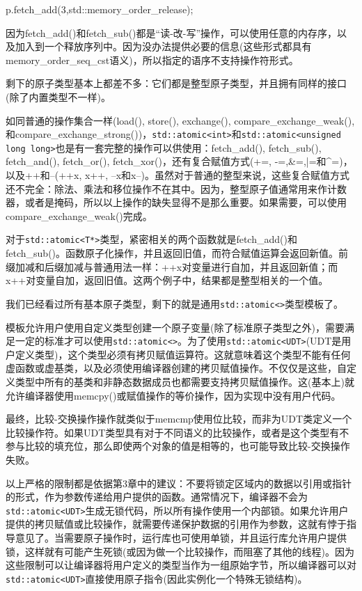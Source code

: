 \begin{cpp}
p.fetch_add(3,std::memory_order_release);
\end{cpp}

因为fetch\_add()和fetch\_sub()都是“读-改-写”操作，可以使用任意的内存序，以及加入到一个释放序列中。因为没办法提供必要的信息(这些形式都具有memory\_order\_seq\_cst语义)，所以指定的语序不支持操作符形式。

剩下的原子类型基本上都差不多：它们都是整型原子类型，并且拥有同样的接口(除了内置类型不一样)。


如同普通的操作集合一样(load(), store(), exchange(), compare\_exchange\_weak(), 和compare\_exchange\_strong())，\texttt{std::atomic<int>}和\texttt{std::atomic<unsigned long long>}也是有一套完整的操作可以供使用：fetch\_add(), fetch\_sub(), fetch\_and(), fetch\_or(), fetch\_xor()，还有复合赋值方式(+=, -=,\&=,|=和\^{}=)，以及++和--(++x, x++, --x和x--)。虽然对于普通的整型来说，这些复合赋值方式还不完全：除法、乘法和移位操作不在其中。因为，整型原子值通常用来作计数器，或者是掩码，所以以上操作的缺失显得不是那么重要。如果需要，可以使用compare\_exchange\_weak()完成。

对于\texttt{std::atomic<T*>}类型，紧密相关的两个函数就是fetch\_add()和fetch\_sub()。函数原子化操作，并且返回旧值，而符合赋值运算会返回新值。前缀加减和后缀加减与普通用法一样：++x对变量进行自加，并且返回新值；而x++对变量自加，返回旧值。这两个例子中，结果都是整型相关的一个值。

我们已经看过所有基本原子类型，剩下的就是通用\texttt{std::atomic<>}类型模板了。


模板允许用户使用自定义类型创建一个原子变量(除了标准原子类型之外)，需要满足一定的标准才可以使用\texttt{std::atomic<>}。为了使用\texttt{std::atomic<UDT>}(UDT是用户定义类型)，这个类型必须有拷贝赋值运算符。这就意味着这个类型不能有任何虚函数或虚基类，以及必须使用编译器创建的拷贝赋值操作。不仅仅是这些，自定义类型中所有的基类和非静态数据成员也都需要支持拷贝赋值操作。这(基本上)就允许编译器使用memcpy()或赋值操作的等价操作，因为实现中没有用户代码。

最终，比较-交换操作操作就类似于memcmp使用位比较，而非为UDT类定义一个比较操作符。如果UDT类型具有对于不同语义的比较操作，或者是这个类型有不参与比较的填充位，那么即使两个对象的值是相等的，也可能导致比较-交换操作失败。

以上严格的限制都是依据第3章中的建议：不要将锁定区域内的数据以引用或指针的形式，作为参数传递给用户提供的函数。通常情况下，编译器不会为\texttt{std::atomic<UDT>}生成无锁代码，所以所有操作使用一个内部锁。如果允许用户提供的拷贝赋值或比较操作，就需要传递保护数据的引用作为参数，这就有悖于指导意见了。当需要原子操作时，运行库也可使用单锁，并且运行库允许用户提供锁，这样就有可能产生死锁(或因为做一个比较操作，而阻塞了其他的线程)。因为这些限制可以让编译器将用户定义的类型当作为一组原始字节，所以编译器可以对\texttt{std::atomic<UDT>}直接使用原子指令(因此实例化一个特殊无锁结构)。

